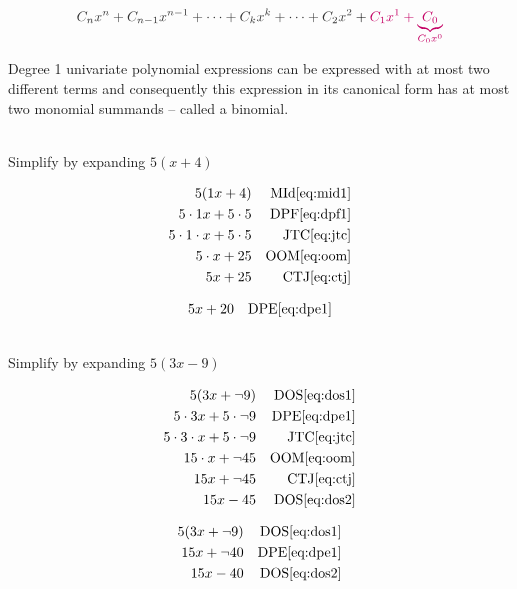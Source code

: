 \documentclass[20150903-160354-rs2.2-MarksMathNotebook.tex]{subfiles}
\begin{document}
\[
\cDarkGrey{C_{n}x^{n}+C_{n-1}x^{n-1}+ \cdots + C_{k}x^{k} + \cdots + C_{2}x^{2}}+\cRed{C_{1}x^{1}+\underbrace{C_{0}}_{C_{0}x^{0}}}
\]

Degree 1 univariate polynomial expressions can be expressed with at most two different terms and consequently this expression in its canonical form has at most two monomial summands -- called a binomial.

\begin{example}[id:20141109-090809] \label{20141109-090809}  \hfill \\

Simplify by expanding $5(x+4)$

\soln

\solnsteps
\begin{align*}
5(1x+4) && \text{MId} \eqref{eq:mid1} \\
5 \cdot 1x + 5 \cdot 5 && \text{DPF} \eqref{eq:dpf1} \\
5 \cdot 1 \cdot x + 5 \cdot 5 && \text{JTC} \eqref{eq:jtc} \\
5 \cdot x + 25  && \text{OOM} \eqref{eq:oom} \\
5x + 25  && \text{CTJ} \eqref{eq:ctj}
\end{align*}

\soln

\lesssteps
\begin{align*}
5x + 20 && \text{DPE} \eqref{eq:dpe1}
\end{align*}

\end{example}

\begin{example}[id:20141109-091015] \label{20141109-091015}  \hfill \\

Simplify by expanding $5(3x-9)$

\soln

\solnsteps
\begin{align*}
5(3x+ \neg 9)  && \text{DOS} \eqref{eq:dos1} \\
5 \cdot 3x + 5 \cdot \neg 9  && \text{DPE} \eqref{eq:dpe1} \\
5 \cdot 3 \cdot x + 5 \cdot \neg 9  && \text{JTC} \eqref{eq:jtc} \\
15 \cdot x + \neg 45  && \text{OOM} \eqref{eq:oom} \\
15x + \neg 45  && \text{CTJ} \eqref{eq:ctj} \\
15x - 45  && \text{DOS} \eqref{eq:dos2}
\end{align*}

\soln

\lesssteps
\begin{align*}
5(3x+\neg 9) && \text{DOS} \eqref{eq:dos1} \\
15x+ \neg 40 && \text{DPE} \eqref{eq:dpe1} \\
15x-40 && \text{DOS} \eqref{eq:dos2}
\end{align*}

\end{example}
\end{document}
